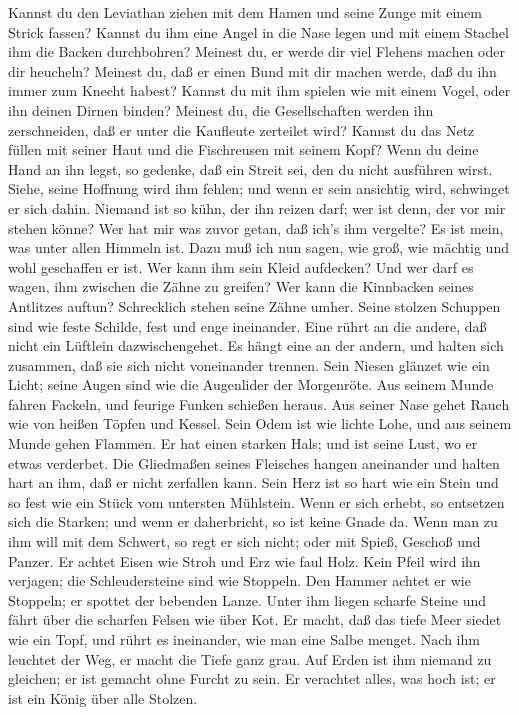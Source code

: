 Kannst du den Leviathan ziehen mit dem Hamen und seine
Zunge mit einem Strick fassen?  Kannst du ihm eine Angel in
die Nase legen und mit einem Stachel ihm die Backen durchbohren?
 Meinest du, er werde dir viel Flehens machen oder dir
heucheln?  Meinest du, daß er einen Bund mit dir machen
werde, daß du ihn immer zum Knecht habest?  Kannst du mit
ihm spielen wie mit einem Vogel, oder ihn deinen Dirnen binden?
 Meinest du, die Gesellschaften werden ihn zerschneiden, daß
er unter die Kaufleute zerteilet wird?  Kannst du das Netz
füllen mit seiner Haut und die Fischreusen mit seinem Kopf? 
Wenn du deine Hand an ihn legst, so gedenke, daß ein Streit sei, den du
nicht ausführen wirst.  Siehe, seine Hoffnung wird ihm
fehlen; und wenn er sein ansichtig wird, schwinget er sich dahin.
 Niemand ist so kühn, der ihn reizen darf; wer ist denn,
der vor mir stehen könne?  Wer hat mir was zuvor getan, daß
ich's ihm vergelte? Es ist mein, was unter allen Himmeln ist.
 Dazu muß ich nun sagen, wie groß, wie mächtig und wohl
geschaffen er ist.  Wer kann ihm sein Kleid aufdecken? Und
wer darf es wagen, ihm zwischen die Zähne zu greifen?  Wer
kann die Kinnbacken seines Antlitzes auftun? Schrecklich stehen seine
Zähne umher.  Seine stolzen Schuppen sind wie feste
Schilde, fest und enge ineinander.  Eine rührt an die
andere, daß nicht ein Lüftlein dazwischengehet.  Es hängt
eine an der andern, und halten sich zusammen, daß sie sich nicht
voneinander trennen.  Sein Niesen glänzet wie ein Licht;
seine Augen sind wie die Augenlider der Morgenröte.  Aus
seinem Munde fahren Fackeln, und feurige Funken schießen heraus.
 Aus seiner Nase gehet Rauch wie von heißen Töpfen und
Kessel.  Sein Odem ist wie lichte Lohe, und aus seinem
Munde gehen Flammen.  Er hat einen starken Hals; und ist
seine Lust, wo er etwas verderbet.  Die Gliedmaßen seines
Fleisches hangen aneinander und halten hart an ihm, daß er nicht
zerfallen kann.  Sein Herz ist so hart wie ein Stein und so
fest wie ein Stück vom untersten Mühlstein.  Wenn er sich
erhebt, so entsetzen sich die Starken; und wenn er daherbricht, so ist
keine Gnade da.  Wenn man zu ihm will mit dem Schwert, so
regt er sich nicht; oder mit Spieß, Geschoß und Panzer.  Er
achtet Eisen wie Stroh und Erz wie faul Holz.  Kein Pfeil
wird ihn verjagen; die Schleudersteine sind wie Stoppeln. 
Den Hammer achtet er wie Stoppeln; er spottet der bebenden Lanze.
 Unter ihm liegen scharfe Steine und fährt über die
scharfen Felsen wie über Kot.  Er macht, daß das tiefe Meer
siedet wie ein Topf, und rührt es ineinander, wie man eine Salbe menget.
 Nach ihm leuchtet der Weg, er macht die Tiefe ganz grau.
 Auf Erden ist ihm niemand zu gleichen; er ist gemacht ohne
Furcht zu sein.  Er verachtet alles, was hoch ist; er ist
ein König über alle Stolzen.

